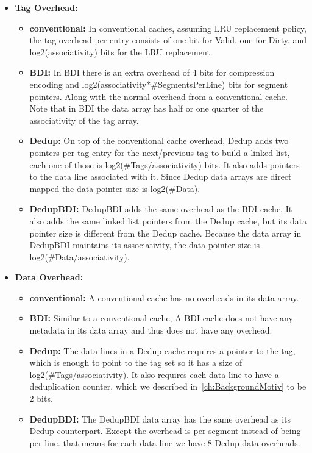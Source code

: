 \begin{itemize}
    \item \textbf{Tag Overhead:}
    \begin{itemize}
        \item \textbf{conventional:} In conventional caches, assuming LRU replacement policy, the tag overhead per entry consists of one bit for Valid, one for Dirty, and log2(associativity) bits for the LRU replacement. 
        \item \textbf{BDI:} In BDI there is an extra overhead of 4 bits for compression encoding and log2(associativity*\#SegmentsPerLine) bits for segment pointers. Along with the normal overhead from a conventional cache. Note that in BDI the data array has half or one quarter of the associativity of the tag array.
        \item \textbf{Dedup:} On top of the conventional cache overhead, Dedup adds two pointers per tag entry for the next/previous tag to build a linked list, each one of those is log2(\#Tags/associativity) bits. It also adds pointers to the data line associated with it. Since Dedup data arrays are direct mapped the data pointer size is log2(\#Data).
        \item \textbf{DedupBDI:} DedupBDI adds the same overhead as the BDI cache. It also adds the same linked list pointers from the Dedup cache, but its data pointer size is different from the Dedup cache. Because the data array in DedupBDI maintains its associativity, the data pointer size is log2(\#Data/associativity).
    \end{itemize}
    \item \textbf{Data Overhead:}
    \begin{itemize}
        \item \textbf{conventional:} A conventional cache has no overheads in its data array.
        \item \textbf{BDI:} Similar to a conventional cache, A BDI cache does not have any metadata in its data array and thus does not have any overhead.
        \item \textbf{Dedup:} The data lines in a Dedup cache requires a pointer to the tag, which is enough to point to the tag set so it has a size of log2(\#Tags/associativity). It also requires each data line to have a deduplication counter, which we described in~\ref{ch:BackgroundMotiv} to be 2 bits.
        \item \textbf{DedupBDI:} The DedupBDI data array has the same overhead as its Dedup counterpart. Except the overhead is per segment instead of being per line. that means for each data line we have 8 Dedup data overheads.

\end{itemize}
\end{itemize}
